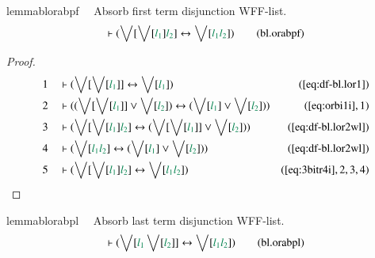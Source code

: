 \begin{restatable}{lemma}{blorabpf}~~ Absorb first term disjunction WFF-list.
\begin{align}
\vdash ( \bigvee[ \bigvee[ \mwl{l_1} ] \mwl{l_2} ] \leftrightarrow \bigvee[
    \mwl{l_1} \mwl{l_2} ] )\label{eq:bl.orabpf}\tag{bl.orabpf}
\end{align}
\end{restatable}

\begin{proof}
\begin{align}
  1 &&  & \vdash ( \bigvee[ \bigvee[ \mwl{l_1} ] ] \leftrightarrow \bigvee[
      \mwl{l_1} ] )&(\mbox{\ref{eq:df-bl.lor1}})\notag
  \\ 2 &&  & \vdash ( ( \bigvee[ \bigvee[ \mwl{l_1} ] ] \vee \bigvee[ \mwl{l_2}
      ] ) \leftrightarrow ( \bigvee[ \mwl{l_1} ] \vee
      \bigvee[ \mwl{l_2} ] )
      )&(\mbox{\ref{eq:orbi1i}},1)\notag
  \\ 3 &&  & \vdash ( \bigvee[ \bigvee[ \mwl{l_1} ] \mwl{l_2} ] \leftrightarrow
      ( \bigvee[ \bigvee[ \mwl{l_1} ] ] \vee \bigvee[
      \mwl{l_2} ] ) )&(\mbox{\ref{eq:df-bl.lor2wl}})\notag
  \\ 4 &&  & \vdash ( \bigvee[ \mwl{l_1} \mwl{l_2} ] \leftrightarrow ( \bigvee[
      \mwl{l_1} ] \vee \bigvee[ \mwl{l_2} ] )
      )&(\mbox{\ref{eq:df-bl.lor2wl}})\notag
  \\ 5 &&  & \vdash ( \bigvee[ \bigvee[ \mwl{l_1} ] \mwl{l_2} ] \leftrightarrow
      \bigvee[ \mwl{l_1} \mwl{l_2} ]
      )&(\mbox{\ref{eq:3bitr4i}},2,3,4)\notag
\end{align}
\end{proof}

\begin{restatable}{lemma}{blorabpl}~~ Absorb last term disjunction WFF-list.
\begin{align}
\vdash ( \bigvee[ \mwl{l_1} \bigvee[ \mwl{l_2} ] ] \leftrightarrow \bigvee[
    \mwl{l_1} \mwl{l_2} ] )\label{eq:bl.orabpl}\tag{bl.orabpl}
\end{align}
\end{restatable}

